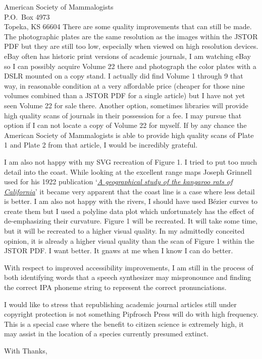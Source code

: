 \documentclass[letterpaper,11pt]{letter}
\begin{document}
\begin{letter}{American Society of Mammalogists\\P.O.\ Box 4973\\Topeka, KS 66604}
There are some quality improvements that can still be made. The photographic plates are the same resolution as the images within the JSTOR PDF but they are still too low, especially when viewed on high resolution devices. eBay often has historic print versions of academic journals, I am watching eBay so I can possibly acquire Volume 22 there and photograph the color plates with a DSLR mounted on a copy stand. I actually did find Volume 1 through 9 that way, in reasonable condition at a very affordable price (cheaper for those nine volumes combined than a JSTOR PDF for a single article) but I have not yet seen Volume 22 for sale there. Another option, sometimes libraries will provide high quality scans of journals in their possession for a fee. I may pursue that option if I can not locate a copy of Volume 22 for myself. If by any chance the American Society of Mammalogists is able to provide high quality scans of Plate 1 and Plate 2 from that article, I would be incredibly grateful.

I am also not happy with my SVG recreation of Figure 1. I tried to put too much detail into the coast. While looking at the excellent range maps Joseph Grinnell used for his 1922 publication `\textit{\ul{A geographical study of the kangaroo rats of California}}' it became very apparent that the coast line is a case where less detail is better. I am also not happy with the rivers, I should have used B\'ezier curves to create them but I used a polyline data plot which unfortunately has the effect of de-emphasizing their curvature. Figure 1 will be recreated. It will take some time, but it will be recreated to a higher visual quality. In my admittedly conceited opinion, it is already a higher visual quality than the scan of Figure 1 within the JSTOR PDF. I want better. It gnaws at me when I know I can do better.

With respect to improved accessibility improvements, I am still in the process of both identifying words that a speech synthesizer may mispronounce and finding the correct IPA phoneme string to represent the correct pronunciations.

I would like to stress that republishing academic journal articles still under copyright protection is not something Pipfrosch Press will do with high frequency. This is a special case where the benefit to citizen science is extremely high, it may assist in the location of a species currently presumed extinct.

\closing{With Thanks,}


\end{letter}
\end{document}
